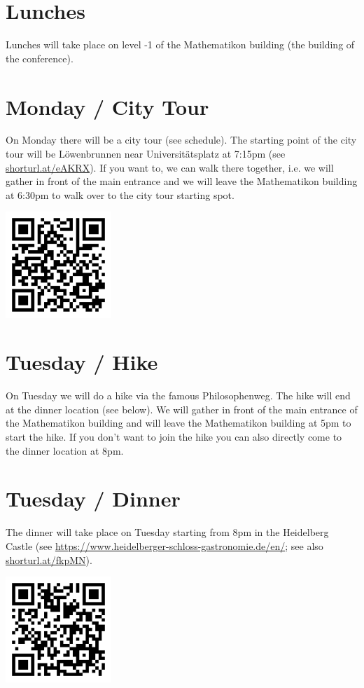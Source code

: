 \documentclass{article}
\begin{document}
\section{Lunches}
Lunches will take place on level -1 of the Mathematikon building (the building of the conference). 

\section{Monday / City Tour}
On Monday there will be a city tour (see schedule). The starting point of the city tour will be Löwenbrunnen near Universitätsplatz at 7:15pm (see \url{shorturl.at/eAKRX}). If you want to, we can walk there together, i.e. we will gather in front of the main entrance and we will leave the Mathematikon building at 6:30pm to walk over to the city tour starting spot. 
\begin{center}
        \includegraphics[width=4cm]{qr-code_citytour.png}
\end{center}

\section{Tuesday / Hike}

On Tuesday we will do a hike via the famous Philosophenweg. The hike will end at the dinner location (see below). We will gather in front of the main entrance of the Mathematikon building and will leave the Mathematikon building at 5pm to start the hike. If you don't want to join the hike you can also directly come to the dinner location at 8pm.
\section{Tuesday / Dinner}
The dinner will take place on Tuesday starting from 8pm in the Heidelberg Castle (see \url{https://www.heidelberger-schloss-gastronomie.de/en/}; see also \url{shorturl.at/fkpMN}).  
\begin{center}
        \includegraphics[width=4cm]{qr-code_schloss_location.png}
\end{center}
\end{document}
